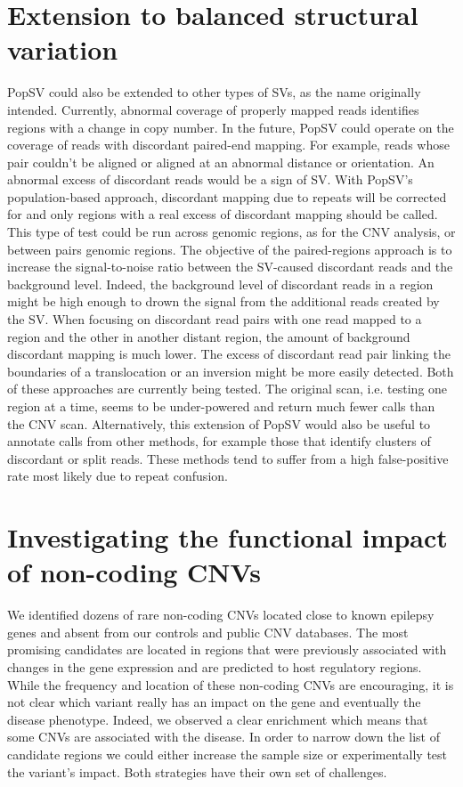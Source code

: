 \section*{Extension to balanced structural variation}
{\sf PopSV} could also be extended to other types of SVs, as the name originally intended.
Currently, abnormal coverage of properly mapped reads identifies regions with a change in copy number.
In the future, {\sf PopSV} could operate on the coverage of reads with discordant paired-end mapping.
For example, reads whose pair couldn't be aligned or aligned at an abnormal distance or orientation.
An abnormal excess of discordant reads would be a sign of SV.
With {\sf PopSV}'s population-based approach, discordant mapping due to repeats will be corrected for and only regions with a real excess of discordant mapping should be called.
This type of test could be run across genomic regions, as for the CNV analysis, or between pairs genomic regions.
The objective of the paired-regions approach is to increase the signal-to-noise ratio between the SV-caused discordant reads and the background level.
Indeed, the background level of discordant reads in a region might be high enough to drown the signal from the additional reads created by the SV.
When focusing on discordant read pairs with one read mapped to a region and the other in another distant region, the amount of background discordant mapping is much lower.
The excess of discordant read pair linking the boundaries of a translocation or an inversion might be more easily detected.
Both of these approaches are currently being tested.
The original scan, i.e. testing one region at a time, seems to be under-powered and return much fewer calls than the CNV scan.
Alternatively, this extension of {\sf PopSV} would also be useful to annotate calls from other methods, for example those that identify clusters of discordant or split reads.
These methods tend to suffer from a high false-positive rate most likely due to repeat confusion.

\section*{Investigating the functional impact of non-coding CNVs}

We identified dozens of rare non-coding CNVs located close to known epilepsy genes and absent from our controls and public CNV databases.
The most promising candidates are located in regions that were previously associated with changes in the gene expression and are predicted to host regulatory regions.
While the frequency and location of these non-coding CNVs are encouraging, it is not clear which variant really has an impact on the gene and eventually the disease phenotype.
Indeed, we observed a clear enrichment which means that some CNVs are associated with the disease.
In order to narrow down the list of candidate regions we could either increase the sample size or experimentally test the variant's impact.
Both strategies have their own set of challenges.

